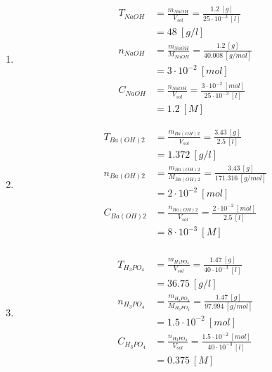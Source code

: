 \documentclass[
  11pt,
  a4paper,
  openany]{book}
\providecommand{\tightlist}{%
  \setlength{\itemsep}{0pt}\setlength{\parskip}{0pt}}
\begin{document}
\begin{Answer}

\begin{enumerate}
\def\labelenumi{\alph{enumi}.}
\tightlist
\item
  \[
  \begin{split}
    T_{NaOH} &= \frac{m_{NaOH}}{V_{sol}} = \frac{1.2\ [g]}{25 \cdot 10^{-3}\ [l]} \\
    &= 48\ [g/l] \\
    n_{NaOH} &= \frac{m_{NaOH}}{M_{NaOH}} = \frac{1.2\ [g]}{40.008\ [g/mol]} \\
    &= 3 \cdot 10^{-2}\ [mol] \\
    C_{NaOH} &= \frac{n_{NaOH}}{V_{sol}} = \frac{3 \cdot 10^{-2}\ [mol]}{25 \cdot 10^{-3}\ [l]} \\
    &= 1.2\ [M]
  \end{split}
  \]
\item
  \[
  \begin{split}
    T_{Ba(OH)2} &= \frac{m_{Ba(OH)2}}{V_{sol}} = \frac{3.43\ [g]}{2.5\ [l]} \\
    &= 1.372\ [g/l] \\
    n_{Ba(OH)2} &= \frac{m_{Ba(OH)2}}{M_{Ba(OH)2}} = \frac{3.43\ [g]}{171.316\ [g/mol]} \\
    &= 2 \cdot 10^{-2}\ [mol] \\
    C_{Ba(OH)2} &= \frac{n_{Ba(OH)2}}{V_{sol}} = \frac{2 \cdot 10^{-2}\ [mol]}{2.5\ [l]} \\
    &= 8 \cdot 10^{-3}\ [M] \\
  \end{split}
  \]
\item
  \[
  \begin{split}
    T_{H_3PO_4} &= \frac{m_{H_3PO_4}}{V_{sol}} = \frac{1.47\ [g]}{40 \cdot 10^{-3}\ [l]} \\
    &= 36.75\ [g/l] \\
    n_{H_3PO_4} &= \frac{m_{H_3PO_4}}{M_{H_3PO_4}} = \frac{1.47\ [g]}{97.994\ [g/mol]} \\
    &= 1.5 \cdot 10^{-2}\ [mol] \\
    C_{H_3PO_4} &= \frac{n_{H_3PO_4}}{V_{sol}} = \frac{1.5 \cdot 10^{-2}\ [mol]}{40 \cdot 10^{-3}\ [l]} \\
    &= 0.375\ [M] \\
  \end{split}
  \]
\end{enumerate}

\end{Answer}
\end{document}
